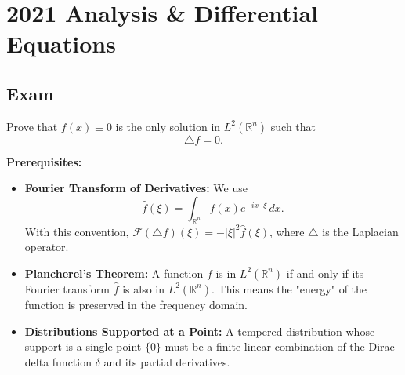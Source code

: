 \section{2021 Analysis \& Differential Equations}

\subsection{Exam}

\begin{exercise}
\label{analysis:2021:1}
Prove that $f(x)\equiv 0$ is the only solution in $L^2(\mathbb{R}^n)$ such that
\[
\triangle f = 0.
\]
\end{exercise}

\begin{solution}
\textbf{Prerequisites:}
\begin{itemize}
    \item \textbf{Fourier Transform of Derivatives:} We use
    \[
    \widehat f(\xi)=\int_{\mathbb{R}^n}f(x)e^{-ix\cdot\xi}\,dx.
    \]
    With this convention, $\mathcal{F}(\triangle f)(\xi) = -|\xi|^2 \hat{f}(\xi)$, where $\triangle$ is the Laplacian operator.
    \item \textbf{Plancherel's Theorem:} A function $f$ is in $L^2(\mathbb{R}^n)$ if and only if its Fourier transform $\hat{f}$ is also in $L^2(\mathbb{R}^n)$. This means the "energy" of the function is preserved in the frequency domain.
    \item \textbf{Distributions Supported at a Point:} A tempered distribution whose support is a single point $\{0\}$ must be a finite linear combination of the Dirac delta function $\delta$ and its partial derivatives.
\end{itemize}


\end{solution}
